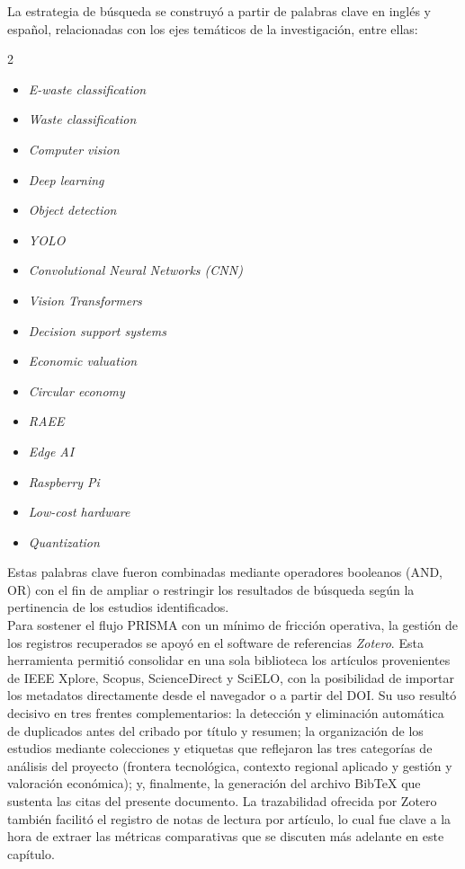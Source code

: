 La estrategia de búsqueda se construyó a partir de palabras clave en inglés y español, relacionadas con los ejes temáticos de la investigación, entre ellas:

\begin{multicols}{2}
\begin{itemize}
    \item \textit{E-waste classification}
    \item \textit{Waste classification}
    \item \textit{Computer vision}
    \item \textit{Deep learning}
    \item \textit{Object detection}
    \item \textit{YOLO}
    \item \textit{Convolutional Neural Networks (CNN)}
    \item \textit{Vision Transformers}
    \item \textit{Decision support systems}
    \item \textit{Economic valuation}
    \item \textit{Circular economy}
    \item \textit{RAEE}
    \item \textit{Edge AI}
    \item \textit{Raspberry Pi}
    \item \textit{Low-cost hardware}
    \item \textit{Quantization}
\end{itemize}
\end{multicols}

Estas palabras clave fueron combinadas mediante operadores booleanos (AND, OR) con el fin de ampliar o restringir los resultados de búsqueda según la pertinencia de los estudios identificados.\\

Para sostener el flujo PRISMA con un mínimo de fricción operativa, la gestión de los registros recuperados se apoyó en el software de referencias \textit{Zotero}. Esta herramienta permitió consolidar en una sola biblioteca los artículos provenientes de IEEE Xplore, Scopus, ScienceDirect y SciELO, con la posibilidad de importar los metadatos directamente desde el navegador o a partir del DOI. Su uso resultó decisivo en tres frentes complementarios: la detección y eliminación automática de duplicados antes del cribado por título y resumen; la organización de los estudios mediante colecciones y etiquetas que reflejaron las tres categorías de análisis del proyecto (frontera tecnológica, contexto regional aplicado y gestión y valoración económica); y, finalmente, la generación del archivo BibTeX que sustenta las citas del presente documento. La trazabilidad ofrecida por Zotero también facilitó el registro de notas de lectura por artículo, lo cual fue clave a la hora de extraer las métricas comparativas que se discuten más adelante en este capítulo.\\

